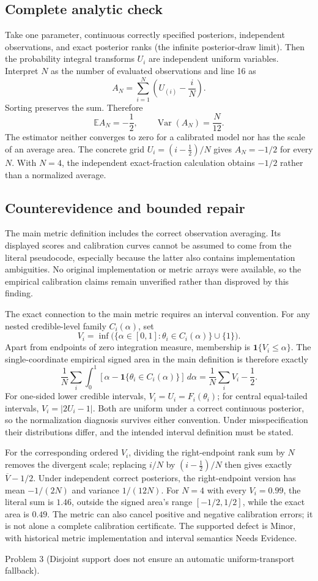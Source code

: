 \documentclass[10pt]{article}
\begin{document}
\subsection*{Complete analytic check}
Take one parameter, continuous correctly specified posteriors, independent observations, and exact posterior ranks (the infinite posterior-draw limit). Then the probability integral transforms \(U_i\) are independent uniform variables. Interpret \(N\) as the number of evaluated observations and line 16 as \[A_N=\sum_{i=1}^{N}\left(U_{(i)}-\frac{i}{N}\right).\] Sorting preserves the sum. Therefore \[\mathbb E A_N=-\frac12,\qquad
\operatorname{Var}(A_N)=\frac{N}{12}.\] The estimator neither converges to zero for a calibrated model nor has the scale of an average area. The concrete grid \(U_i=(i-\frac12)/N\) gives \(A_N=-1/2\) for every \(N\). With \(N=4\), the independent exact-fraction calculation obtains \(-1/2\) rather than a normalized average.\par
\subsection*{Counterevidence and bounded repair}
The main metric definition includes the correct observation averaging. Its displayed scores and calibration curves cannot be assumed to come from the literal pseudocode, especially because the latter also contains implementation ambiguities. No original implementation or metric arrays were available, so the empirical calibration claims remain unverified rather than disproved by this finding.\par
The exact connection to the main metric requires an interval convention. For any nested credible-level family \(C_i(\alpha)\), set \[V_i=\inf\bigl(\{\alpha\in[0,1]:\theta_i\in C_i(\alpha)\}\cup\{1\}\bigr).\] Apart from endpoints of zero integration measure, membership is \(\mathbf{1}\{V_i\le\alpha\}\). The single-coordinate empirical signed area in the main definition is therefore exactly \[\frac1N\sum_i\int_0^1
 [\alpha-\mathbf{1}\{\theta_i\in C_i(\alpha)\}]\,d\alpha
 =\frac1N\sum_i V_i-\frac12.\] For one-sided lower credible intervals, \(V_i=U_i=F_i(\theta_i)\); for central equal-tailed intervals, \(V_i=|2U_i-1|\). Both are uniform under a correct continuous posterior, so the normalization diagnosis survives either convention. Under misspecification their distributions differ, and the intended interval definition must be stated.\par
For the corresponding ordered \(V_i\), dividing the right-endpoint rank sum by \(N\) removes the divergent scale; replacing \(i/N\) by \((i-\frac12)/N\) then gives exactly \(\overline V-1/2\). Under independent correct posteriors, the right-endpoint version has mean \(-1/(2N)\) and variance \(1/(12N)\). For \(N=4\) with every \(V_i=0.99\), the literal sum is \(1.46\), outside the signed area’s range \([-1/2,1/2]\), while the exact area is \(0.49\). The metric can also cancel positive and negative calibration errors; it is not alone a complete calibration certificate. The supported defect is Minor, with historical metric implementation and interval semantics Needs Evidence.\par
Problem 3 (Disjoint support does not ensure an automatic uniform-transport fallback).\par
\end{document}

